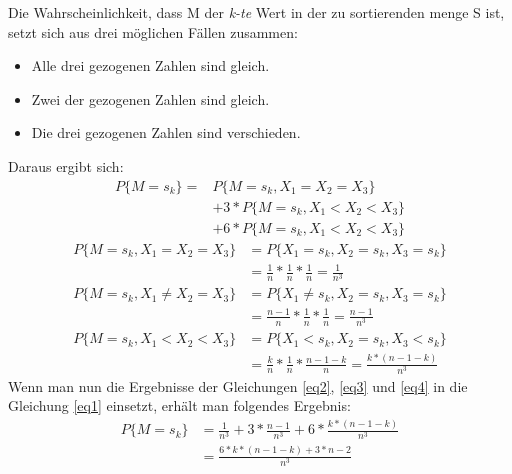 \documentclass[11pt,a4paper]{article}
\begin{document}
      Die Wahrscheinlichkeit, dass M der \textit{k-te} Wert in der zu sortierenden menge S ist, setzt sich aus drei möglichen Fällen zusammen:
      \begin{itemize}
      	\item Alle drei gezogenen Zahlen sind gleich.
      	\item Zwei der gezogenen Zahlen sind gleich.
      	\item Die drei gezogenen Zahlen sind verschieden.
      \end{itemize}
      Daraus ergibt sich:
      \begin{equation} \label{eq1}
      	\begin{split}
      	  P\{ M=s_k \} = & P\{ M=s_k , X_1 =X_2 =X_3 \} \\
      	  & + 3*P\{ M=s_k , X_1 < X_2 < X_3 \}\\
      	  & + 6*P\{ M=s_k , X_1 < X_2 < X_3 \}
      	  \end{split}
      \end{equation}
      \begin{equation} \label{eq2}
        \begin{split}
          P\{ M=s_k , X_1 =X_2 =X_3 \} & = P\{X_1 =s_k , X_2 =s_k , X_3 =s_k \}\\
          & = \frac{1}{n} * \frac{1}{n} * \frac{1}{n} = \frac{1}{n^3}
        \end{split}
      \end{equation}
      \begin{equation} \label{eq3}
      	\begin{split}
      	  P\{ M=s_k , X_1 \neq X_2 =X_3 \} & = P\{X_1 \neq s_k , X_2 =s_k , X_3 =s_k \}\\
      	  & = \frac{n-1}{n} * \frac{1}{n} * \frac{1}{n} = \frac{n-1}{n^3}
      	\end{split}
      \end{equation}
      \begin{equation} \label{eq4}
      	\begin{split}
      	  P\{ M=s_k , X_1 < X_2 < X_3 \} & = P\{X_1 < s_k , X_2 =s_k , X_3 < s_k \}\\
      	  & = \frac{k}{n} * \frac{1}{n} * \frac{n-1-k}{n} = \frac{k*(n-1-k)}{n^3}
      	\end{split}
      \end{equation}
      \newpage
      Wenn man nun die Ergebnisse der Gleichungen \ref{eq2}, \ref{eq3} und \ref{eq4} in die Gleichung \ref{eq1} einsetzt, erhält man folgendes Ergebnis:
      \begin{equation} \label{eq5}
      	\begin{split}
      	  P\{ M=s_k \} & = \frac{1}{n^3} + 3*\frac{n-1}{n^3} + 6*\frac{k*(n-1-k
      	  	)}{n^3} \\
      	  & = \frac{6*k*(n-1-k) + 3*n - 2}{n^3}
      	\end{split}
      \end{equation}
      
\end{document}
